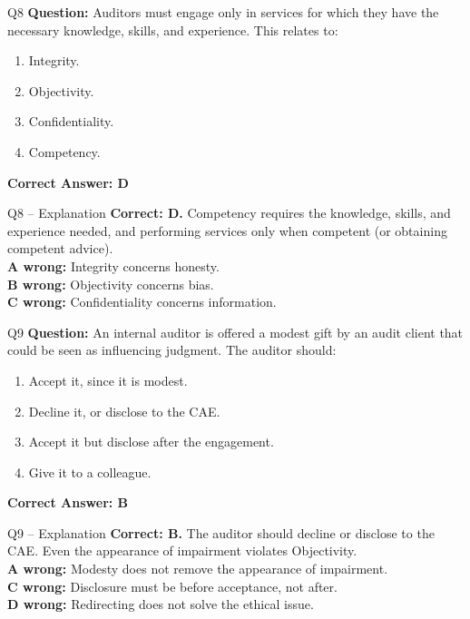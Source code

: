 \documentclass[aspectratio=169,10pt]{beamer}
\begin{document}
	\begin{frame}[t]{Q8}
		\small
		\textbf{Question:} Auditors must engage only in services for which they have the necessary knowledge, skills, and experience. This relates to:
		\begin{enumerate}[label=\Alph*.,itemsep=1pt,topsep=2pt]
			\item Integrity.
			\item Objectivity.
			\item Confidentiality.
			\item Competency.
		\end{enumerate}
		\vspace{4pt}
		\textbf{Correct Answer: D}
	\end{frame}
	
	\begin{frame}[t]{Q8 -- Explanation}
		\small
		\textbf{Correct: D.} Competency requires the knowledge, skills, and experience needed, and performing services only when competent (or obtaining competent advice). \\[4pt]
		\textbf{A wrong:} Integrity concerns honesty. \\[2pt]
		\textbf{B wrong:} Objectivity concerns bias. \\[2pt]
		\textbf{C wrong:} Confidentiality concerns information.
	\end{frame}
	
	\begin{frame}[t]{Q9}
		\small
		\textbf{Question:} An internal auditor is offered a modest gift by an audit client that could be seen as influencing judgment. The auditor should:
		\begin{enumerate}[label=\Alph*.,itemsep=1pt,topsep=2pt]
			\item Accept it, since it is modest.
			\item Decline it, or disclose to the CAE.
			\item Accept it but disclose after the engagement.
			\item Give it to a colleague.
		\end{enumerate}
		\vspace{4pt}
		\textbf{Correct Answer: B}
	\end{frame}
	
	\begin{frame}[t]{Q9 -- Explanation}
		\small
		\textbf{Correct: B.} The auditor should decline or disclose to the CAE. Even the appearance of impairment violates Objectivity. \\[4pt]
		\textbf{A wrong:} Modesty does not remove the appearance of impairment. \\[2pt]
		\textbf{C wrong:} Disclosure must be before acceptance, not after. \\[2pt]
		\textbf{D wrong:} Redirecting does not solve the ethical issue.
	\end{frame}
	
\end{document}
